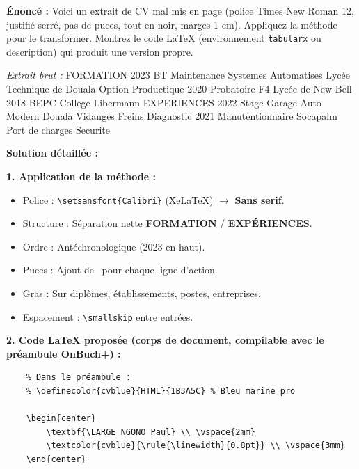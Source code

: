 \documentclass[11pt]{article}
\begin{document}
\begin{exoresolu}
    \textbf{Énoncé :} Voici un extrait de CV mal mis en page (police Times New Roman 12, justifié serré, pas de puces, tout en noir, marges 1 cm). Appliquez la méthode pour le transformer. Montrez le code LaTeX (environnement \texttt{tabularx} ou description) qui produit une version propre.

    \textit{Extrait brut :}
    FORMATION 2023 BT Maintenance Systemes Automatises Lycée Technique de Douala Option Productique 2020 Probatoire F4 Lycée de New-Bell 2018 BEPC College Libermann
    EXPERIENCES 2022 Stage Garage Auto Modern Douala Vidanges Freins Diagnostic 2021 Manutentionnaire Socapalm Port de charges Securite

    \tcblower
    \textbf{Solution détaillée :}

    \textbf{1. Application de la méthode :}
    \begin{itemize}
        \item Police : \texttt{\textbackslash setsansfont\{Calibri\}} (XeLaTeX) $\rightarrow$ \textbf{Sans serif}.
        \item Structure : Séparation nette \textbf{FORMATION} / \textbf{EXPÉRIENCES}.
        \item Ordre : Antéchronologique (2023 en haut).
        \item Puces : Ajout de \textbullet\ pour chaque ligne d'action.
        \item Gras : Sur diplômes, établissements, postes, entreprises.
        \item Espacement : \texttt{\textbackslash smallskip} entre entrées.
    \end{itemize}

    \textbf{2. Code LaTeX proposée (corps de document, compilable avec le préambule OnBuch+) :}
    \begin{verbatim}
    % Dans le préambule :     
    % \definecolor{cvblue}{HTML}{1B3A5C} % Bleu marine pro

    \begin{center}
        \textbf{\LARGE NGONO Paul} \\ \vspace{2mm}
        \textcolor{cvblue}{\rule{\linewidth}{0.8pt}} \\ \vspace{3mm}
    \end{center}


\end{verbatim}
\end{exoresolu}
\end{document}
